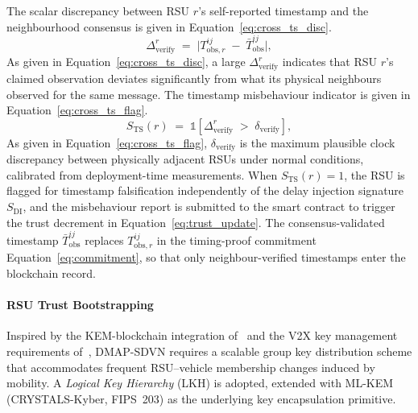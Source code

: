 The scalar discrepancy between RSU $r$'s self-reported timestamp
and the neighbourhood consensus is given in
Equation~\eqref{eq:cross_ts_disc}.
%
\begin{equation}
  \Delta_{\mathrm{verify}}^{r} \;=\;
    \bigl|
      T_{\mathrm{obs},r}^{ij} \;-\; \bar{T}_{\mathrm{obs}}^{ij}
    \bigr|,
  \label{eq:cross_ts_disc}
\end{equation}
%
As given in Equation~\eqref{eq:cross_ts_disc}, a large
$\Delta_{\mathrm{verify}}^{r}$ indicates that RSU $r$'s claimed
observation deviates significantly from what its physical
neighbours observed for the same message. The timestamp
misbehaviour indicator is given in
Equation~\eqref{eq:cross_ts_flag}.
%
\begin{equation}
  S_{\mathrm{TS}}(r) \;=\;
    \mathbb{1}\!\left[
      \Delta_{\mathrm{verify}}^{r} \;>\; \delta_{\mathrm{verify}}
    \right],
  \label{eq:cross_ts_flag}
\end{equation}
%
As given in Equation~\eqref{eq:cross_ts_flag},
$\delta_{\mathrm{verify}}$ is the maximum plausible clock
discrepancy between physically adjacent RSUs under normal
conditions, calibrated from deployment-time measurements.
When $S_{\mathrm{TS}}(r)=1$, the RSU is flagged for timestamp
falsification independently of the delay injection signature
$S_{\mathrm{DI}}$, and the misbehaviour report is submitted to
the smart contract to trigger the trust decrement in
Equation~\eqref{eq:trust_update}. The consensus-validated
timestamp $\bar{T}_{\mathrm{obs}}^{ij}$ replaces
$T_{\mathrm{obs},r}^{ij}$ in the timing-proof commitment
Equation~\eqref{eq:commitment}, so that only neighbour-verified
timestamps enter the blockchain record.



\paragraph{RSU Trust Bootstrapping}
\label{sec:kem_lkh}

Inspired by the KEM-blockchain integration of~\cite{rahman2025quantum}
and the V2X key management requirements of~\cite{cao2025quantum},
DMAP-SDVN requires a scalable group key distribution scheme
that accommodates frequent RSU--vehicle membership changes
induced by mobility. A \emph{Logical Key Hierarchy} (LKH) is
adopted, extended with ML-KEM (CRYSTALS-Kyber, FIPS~203) as the
underlying key encapsulation primitive.

